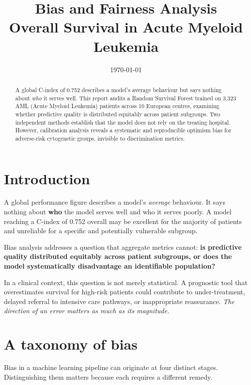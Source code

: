 \documentclass[11pt,a4paper]{article}
\title{\vspace{-1.5cm}\textbf{Bias and Fairness Analysis}\\[0.3cm]
       \large Overall Survival in Acute Myeloid Leukemia}
\date{\today}
\begin{document}
\maketitle
\thispagestyle{fancy}

\begin{abstract}
\noindent
A global C-index of 0.752 describes a model's average behaviour but says nothing about
\emph{who} it serves well. This report audits a Random Survival Forest trained on 3{,}323 AML (Acute Myeloid Leukemia)
patients across 10 European centres, examining whether predictive quality is distributed
equitably across patient subgroups. Two independent methods establish that the model does not
rely on the treating hospital. However, calibration analysis reveals a systematic and
reproducible optimism bias for adverse-risk cytogenetic groups, invisible to discrimination
metrics.
\end{abstract}
\newpage
\tableofcontents
\newpage


\section{Introduction}


A global performance figure describes a model's \emph{average} behaviour. It says nothing about
\textbf{who} the model serves well and who it serves poorly. A model reaching a C-index of
0.752 overall may be excellent for the majority of patients and unreliable for a specific 
and potentially vulnerable subgroup.

Bias analysis addresses a question that aggregate metrics cannot: \textbf{is predictive quality
distributed equitably across patient subgroups, or does the model systematically disadvantage
an identifiable population?}

In a clinical context, this question is not merely statistical. A prognostic tool that
overestimates survival for high-risk patients could contribute to under-treatment, delayed
referral to intensive care pathways, or inappropriate reassurance. \emph{The direction of an
error matters as much as its magnitude.}

\section{A taxonomy of bias}

Bias in a machine learning pipeline can originate at four distinct stages. Distinguishing them
matters because each requires a different remedy.
\end{document}
